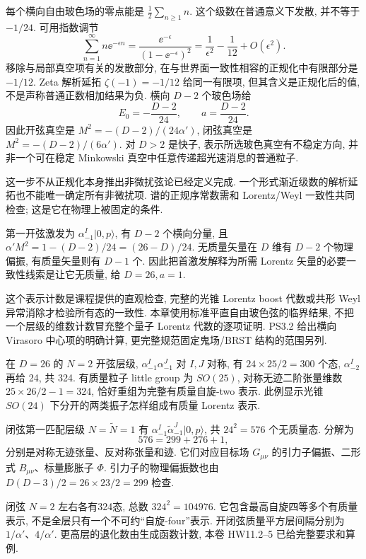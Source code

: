 每个横向自由玻色场的零点能是 $\tfrac12\sum_{n\ge1}n$. 这个级数在普通意义下发散, 并不等于 $-1/24$. 可用指数调节
\[
\sum_{n=1}^\infty n\ee^{-\epsilon n}
=\frac{\ee^{-\epsilon}}{(1-\ee^{-\epsilon})^2}
=\frac1{\epsilon^2}-\frac1{12}+O(\epsilon^2).
\]
移除与局部真空项有关的发散部分, 在与世界面一致性相容的正规化中有限部分是 $-1/12$. Zeta 解析延拓 $\zeta(-1)=-1/12$ 给同一有限项, 但其含义是正规化后的值, 不是声称普通正数相加结果为负. 横向 $D-2$ 个玻色场给
\[
E_0=-\frac{D-2}{24},\qquad a=\frac{D-2}{24}.
\]
因此开弦真空是 $M^2=-(D-2)/(24\alpha')$, 闭弦真空是 $M^2=-(D-2)/(6\alpha')$. 对 $D>2$ 是快子, 表示所选玻色真空有不稳定方向, 并非一个可在稳定 Minkowski 真空中任意传递超光速消息的普通粒子.

这一步不从正规化本身推出非微扰弦论已经定义完成. 一个形式渐近级数的解析延拓也不能唯一确定所有非微扰项. 谱的正规序常数需和 Lorentz/Weyl 一致性共同检查; 这是它在物理上被固定的条件.

第一开弦激发为 $\alpha_{-1}^I|0,p\rangle$, 有 $D-2$ 个横向分量, 且 $\alpha'M^2=1-(D-2)/24=(26-D)/24$. 无质量矢量在 $D$ 维有 $D-2$ 个物理偏振, 有质量矢量则有 $D-1$ 个. 因此把首激发解释为所需 Lorentz 矢量的必要一致性线索是让它无质量, 给 $D=26,a=1$.

这个表示计数是课程提供的直观检查, 完整的光锥 Lorentz boost 代数或共形 Weyl 异常消除才检验所有态的一致性. 本章使用标准平直自由玻色弦的临界结果, 不把一个层级的维数计数冒充整个量子 Lorentz 代数的逐项证明. PS3.2 给出横向 Virasoro 中心项的明确计算, 更完整规范固定鬼场/BRST 结构的范围另列.

在 $D=26$ 的 $N=2$ 开弦层级, $\alpha_{-1}^I\alpha_{-1}^J$ 对 $I,J$ 对称, 有 $24\times25/2=300$ 个态, $\alpha_{-2}^I$ 再给 24, 共 324. 有质量粒子 little group 为 $SO(25)$, 对称无迹二阶张量维数 $25\times26/2-1=324$, 恰好重组为完整有质量自旋-two 表示. 此例显示光锥 $SO(24)$ 下分开的两类振子怎样组成有质量 Lorentz 表示.

闭弦第一匹配层级 $N=\widetilde N=1$ 有 $\alpha_{-1}^I\widetilde\alpha_{-1}^J|0,p\rangle$, 共 $24^2=576$ 个无质量态. 分解为
\[
576=299+276+1,
\]
分别是对称无迹张量、反对称张量和迹. 它们对应目标场 $G_{\mu\nu}$ 的引力子偏振、二形式 $B_{\mu\nu}$、标量膨胀子 $\Phi$. 引力子的物理偏振数也由 $D(D-3)/2=26\times23/2=299$ 检查.

闭弦 $N=2$ 左右各有324态, 总数 $324^2=104976$. 它包含最高自旋四等多个有质量表示, 不是全层只有一个不可约“自旋-four”表示. 开闭弦质量平方层间隔分别为 $1/\alpha'$、$4/\alpha'$. 更高层的退化数由生成函数计数, 本卷 HW11.2--5 已给完整要求和算例.


